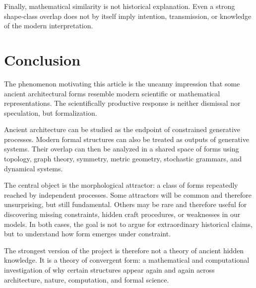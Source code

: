 \documentclass[11pt,a4paper]{article}
\begin{document}
Finally, mathematical similarity is not historical explanation. Even a strong shape-class overlap does not by itself imply intention, transmission, or knowledge of the modern interpretation.

\section{Conclusion}

The phenomenon motivating this article is the uncanny impression that some ancient architectural forms resemble modern scientific or mathematical representations. The scientifically productive response is neither dismissal nor speculation, but formalization.

Ancient architecture can be studied as the endpoint of constrained generative processes. Modern formal structures can also be treated as outputs of generative systems. Their overlap can then be analyzed in a shared space of forms using topology, graph theory, symmetry, metric geometry, stochastic grammars, and dynamical systems.

The central object is the morphological attractor: a class of forms repeatedly reached by independent processes. Some attractors will be common and therefore unsurprising, but still fundamental. Others may be rare and therefore useful for discovering missing constraints, hidden craft procedures, or weaknesses in our models. In both cases, the goal is not to argue for extraordinary historical claims, but to understand how form emerges under constraint.

The strongest version of the project is therefore not a theory of ancient hidden knowledge. It is a theory of convergent form: a mathematical and computational investigation of why certain structures appear again and again across architecture, nature, computation, and formal science.
\end{document}
